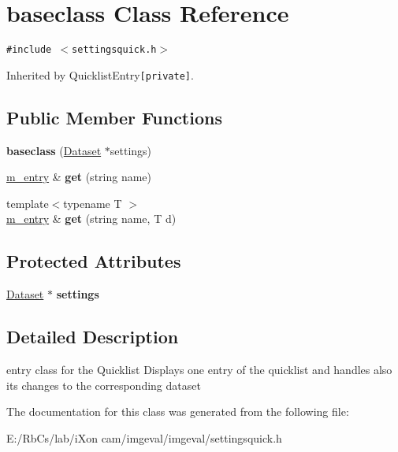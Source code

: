 \hypertarget{classbaseclass}{
\section{baseclass Class Reference}
\label{classbaseclass}
}
{\tt \#include $<$settingsquick.h$>$}

Inherited by QuicklistEntry{\tt  \mbox{[}private\mbox{]}}.

\subsection*{Public Member Functions}
\begin{CompactItemize}
\item 
\hypertarget{classbaseclass_9b6e187b97e7d4886a9890fc27cb05ee}{
\textbf{baseclass} (\hyperlink{class_dataset}{Dataset} $\ast$settings)}
\label{classbaseclass_9b6e187b97e7d4886a9890fc27cb05ee}

\item 
\hypertarget{classbaseclass_6fc08847944850aba6ff2a853827951d}{
\hyperlink{classm__entry}{m\_\-entry} \& \textbf{get} (string name)}
\label{classbaseclass_6fc08847944850aba6ff2a853827951d}

\item 
\hypertarget{classbaseclass_186a31e3e5b4ff1fb5eb111a3b1763ef}{
{\footnotesize template$<$typename T $>$ }\\\hyperlink{classm__entry}{m\_\-entry} \& \textbf{get} (string name, T d)}
\label{classbaseclass_186a31e3e5b4ff1fb5eb111a3b1763ef}

\end{CompactItemize}
\subsection*{Protected Attributes}
\begin{CompactItemize}
\item 
\hypertarget{classbaseclass_f0c546a4a1f13761c53d4c1183e1167c}{
\hyperlink{class_dataset}{Dataset} $\ast$ \textbf{settings}}
\label{classbaseclass_f0c546a4a1f13761c53d4c1183e1167c}

\end{CompactItemize}


\subsection{Detailed Description}
entry class for the Quicklist Displays one entry of the quicklist and handles also its changes to the corresponding dataset 

The documentation for this class was generated from the following file:\begin{CompactItemize}
\item 
E:/RbCs/lab/iXon cam/imgeval/imgeval/settingsquick.h\end{CompactItemize}
